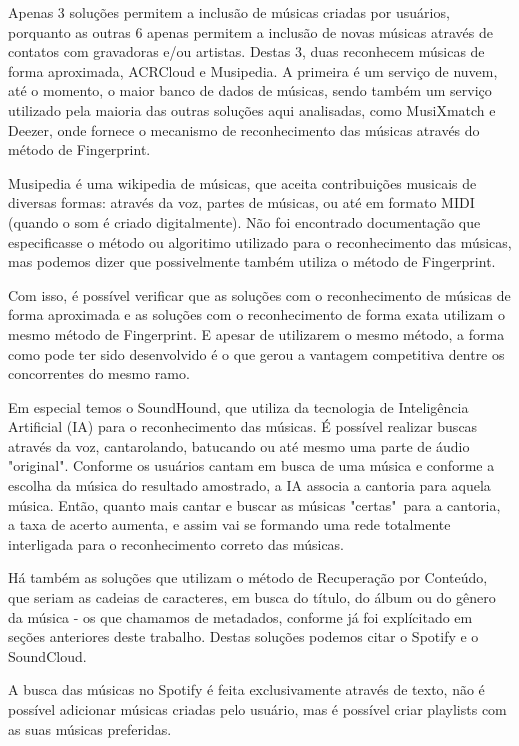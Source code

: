 Apenas 3 soluções permitem a inclusão de músicas criadas por usuários, porquanto as outras 6 apenas permitem a inclusão de novas músicas através de contatos com gravadoras e/ou artistas. Destas 3, duas reconhecem músicas de forma aproximada, ACRCloud e Musipedia. A primeira é um serviço de nuvem, até o momento, o maior banco de dados de músicas, sendo também um serviço utilizado pela maioria das outras soluções aqui analisadas, como MusiXmatch e Deezer, onde fornece o mecanismo de reconhecimento das músicas através do método de Fingerprint.

Musipedia é uma wikipedia de músicas, que aceita contribuições musicais de diversas formas: através da voz, partes de músicas, ou até em formato MIDI (quando o som é criado digitalmente). Não foi encontrado documentação que especificasse o método ou algoritimo utilizado para o reconhecimento das músicas, mas podemos dizer que possivelmente também utiliza o método de Fingerprint.

Com isso, é possível verificar que as soluções com o reconhecimento de músicas de forma aproximada e as soluções com o reconhecimento de forma exata utilizam o mesmo método de Fingerprint. E apesar de utilizarem o mesmo método, a forma como pode ter sido desenvolvido é o que gerou a vantagem competitiva dentre os concorrentes do mesmo ramo.

Em especial temos o SoundHound, que utiliza da tecnologia de Inteligência Artificial (IA)  para o reconhecimento das músicas. É possível realizar buscas através da voz, cantarolando, batucando ou até mesmo uma parte de áudio "original". Conforme os usuários cantam em busca de uma música e conforme a escolha da música do resultado amostrado, a IA associa a cantoria para aquela música. Então, quanto mais cantar e buscar as músicas "certas"\ para a cantoria, a taxa de acerto aumenta, e assim vai se formando uma rede totalmente interligada para o reconhecimento correto das músicas.

Há também as soluções que utilizam o método de Recuperação por Conteúdo, que seriam as cadeias de caracteres, em busca do título, do álbum ou do gênero da música - os que chamamos de metadados, conforme já foi explícitado em seções anteriores deste trabalho. Destas soluções podemos citar o Spotify e o SoundCloud.

A busca das músicas no Spotify é feita exclusivamente através de texto, não é possível adicionar músicas criadas pelo usuário, mas é possível criar playlists com as suas músicas preferidas.

